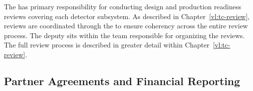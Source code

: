 The  has primary responsibility for conducting design
and production readiness reviews covering each detector subsystem.
As described in Chapter~\ref{vl:tc-review}, reviews are coordinated
through the  to ensure coherency across the entire review
process.  The deputy  sits within the  team
responsible for organizing the reviews.  The full review process is
described in greater detail within Chapter~\ref{vl:tc-review}.


\subsection{Partner Agreements and Financial Reporting}
